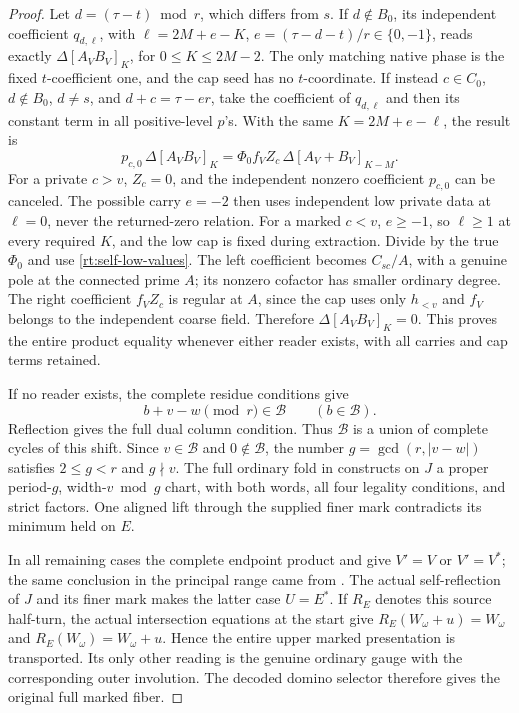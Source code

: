 \documentclass[11pt,a4paper]{amsart}
\numberwithin{equation}{section}
\theoremstyle{plain}
\theoremstyle{definition}
\begin{document}
\begin{proof}
Let \(d=(\tau-t)\bmod r\), which differs from \(s\).
If \(d\notin B_0\), its independent coefficient
\(q_{d,\ell}\), with
\(\ell=2M+e-K\), \(e=(\tau-d-t)/r\in\{0,-1\}\), reads
exactly \(\Delta[A_VB_V]_K\), for \(0\le K\le2M-2\).
The only matching native phase is the fixed \(t\)-coefficient one,
and the cap seed has no \(t\)-coordinate.
If instead \(c\in C_0\), \(d\notin B_0\), \(d\ne s\), and
\(d+c=\tau-er\), take the coefficient of \(q_{d,\ell}\) and then
its constant term in all positive-level \(p\)'s.  With the same
\(K=2M+e-\ell\), the result is
\begin{equation}\label{rt:self-reader-correction}
 p_{c,0}\,\Delta[A_VB_V]_K
       =\Phi_0 f_V Z_c\,\Delta[A_V+B_V]_{K-M}.
\end{equation}
For a private \(c>v\), \(Z_c=0\), and the independent nonzero
coefficient \(p_{c,0}\) can be canceled.  The possible carry \(e=-2\)
then uses independent low private data at \(\ell=0\), never the
returned-zero relation.  For a marked \(c<v\), \(e\ge-1\), so
\(\ell\ge1\) at every required \(K\), and the low cap is fixed
during extraction.  Divide by the true \(\Phi_0\) and use
\eqref{rt:self-low-values}.  The left coefficient becomes \(C_{sc}/A\),
with a genuine pole at the connected prime \(A\); its nonzero cofactor
has smaller ordinary degree.  The right coefficient \(f_VZ_c\) is
regular at \(A\), since the cap uses only \(h_{<v}\) and \(f_V\)
belongs to the independent coarse field.  Therefore
\(\Delta[A_VB_V]_K=0\).  This proves the entire product equality
whenever either reader exists, with all carries and cap terms retained.

If no reader exists, the complete residue conditions give
\[
 b+v-w\pmod r\in\mathcal B\qquad(b\in\mathcal B).
\]
Reflection gives the full dual column condition.  Thus \(\mathcal B\)
is a union of complete cycles of this shift.  Since \(v\in\mathcal B\)
and \(0\notin\mathcal B\), the number
\(g=\gcd(r,|v-w|)\) satisfies \(2\le g<r\) and \(g\nmid v\).
The full ordinary fold in \cite[Ordinary residue fold]{Shields2026Gluing} constructs on \(J\)
a proper period-\(g\), width-\(v\bmod g\) chart, with both words,
all four legality conditions, and strict factors.  One aligned lift
through the supplied finer mark contradicts its minimum held on \(E\).

In all remaining cases the complete endpoint product and
 give \(V'=V\) or \(V'=V^*\); the same
conclusion in the principal range came from .
The actual self-reflection of \(J\) and its finer mark makes the latter
case \(U=E^*\).  If \(R_E\) denotes this source half-turn, the actual
intersection equations at the start give
\(R_E(W_\omega+u)=W_\omega\) and
\(R_E(W_\omega)=W_\omega+u\).  Hence the entire upper marked
presentation is transported.  Its only other reading is the genuine
ordinary gauge with the corresponding outer involution.  The decoded
domino selector therefore gives the original full marked fiber.
\end{proof}
\end{document}
